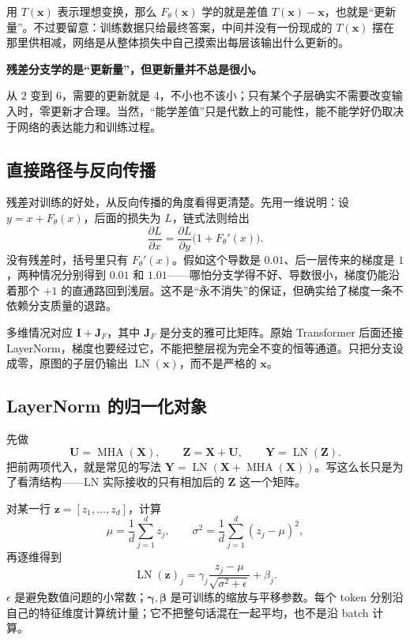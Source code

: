 \documentclass[UTF8,a4paper,12pt]{ctexart}
\numberwithin{equation}{section}
\DeclareMathOperator{\LN}{LN}
\DeclareMathOperator{\MHA}{MHA}
\newcommand{\keypoint}[1]{\par\smallskip\noindent\textbf{#1}\par\smallskip}
\begin{document}
用 $T(\bm x)$ 表示理想变换，那么 $F_\theta(\bm x)$ 学的就是差值 $T(\bm x)-\bm x$，也就是``更新量''。不过要留意：训练数据只给最终答案，中间并没有一份现成的 $T(\bm x)$ 摆在那里供相减，网络是从整体损失中自己摸索出每层该输出什么更新的。

\keypoint{残差分支学的是``更新量''，但更新量并不总是很小。}

从 $2$ 变到 $6$，需要的更新就是 $4$，不小也不该小；只有某个子层确实不需要改变输入时，零更新才合理。当然，``能学差值''只是代数上的可能性，能不能学好仍取决于网络的表达能力和训练过程。

\subsection{直接路径与反向传播}

残差对训练的好处，从反向传播的角度看得更清楚。先用一维说明：设 $y=x+F_\theta(x)$，后面的损失为 $L$，链式法则给出
\begin{equation}
\frac{\partial L}{\partial x}
=\frac{\partial L}{\partial y}\bigl(1+F_\theta'(x)\bigr).
\label{eq:residualgradient}
\end{equation}
没有残差时，括号里只有 $F_\theta'(x)$。假如这个导数是 $0.01$、后一层传来的梯度是 $1$，两种情况分别得到 $0.01$ 和 $1.01$——哪怕分支学得不好、导数很小，梯度仍能沿着那个 $+1$ 的直通路回到浅层。这不是``永不消失''的保证，但确实给了梯度一条不依赖分支质量的退路。

多维情况对应 $\bm I+\bm J_F$，其中 $\bm J_F$ 是分支的雅可比矩阵。原始 Transformer 后面还接 LayerNorm，梯度也要经过它，不能把整层视为完全不变的恒等通道。只把分支设成零，原图的子层仍输出 $\LN(\bm x)$，而不是严格的 $\bm x$。

\subsection{LayerNorm 的归一化对象}

先做
\begin{equation}
\bm U=\MHA(\bm X),\qquad \bm Z=\bm X+\bm U,
\qquad \bm Y=\LN(\bm Z).
\label{eq:lnexpanded}
\end{equation}
把前两项代入，就是常见的写法 $\bm Y=\LN(\bm X+\MHA(\bm X))$。写这么长只是为了看清结构——LN 实际接收的只有相加后的 $\bm Z$ 这一个矩阵。

对某一行 $\bm z=[z_1,\ldots,z_d]$，计算
\begin{equation}
\mu=\frac1d\sum_{j=1}^{d}z_j,\qquad
\sigma^2=\frac1d\sum_{j=1}^{d}(z_j-\mu)^2,
\label{eq:lnstats}
\end{equation}
再逐维得到
\begin{equation}
\LN(\bm z)_j=\gamma_j\frac{z_j-\mu}{\sqrt{\sigma^2+\epsilon}}+\beta_j.
\label{eq:layernorm}
\end{equation}
$\epsilon$ 是避免数值问题的小常数；$\bm\gamma,\bm\beta$ 是可训练的缩放与平移参数。每个 token 分别沿自己的特征维度计算统计量；它不把整句话混在一起平均，也不是沿 batch 计算。
\end{document}
